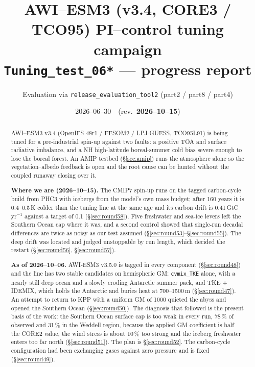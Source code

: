 \documentclass[10pt]{article}
\title{\vspace{-1.5cm}\textbf{AWI--ESM3 (v3.4, CORE3 / TCO95) PI--control tuning campaign}\\[2pt]
\large \texttt{Tuning\_test\_06*} --- progress report}
\author{Evaluation via \texttt{release\_evaluation\_tool2} (part2 / part8 / part4)}
\date{2026--06--30\ \ (rev.\ \textbf{2026--10--15})}
\begin{document}
\maketitle
\vspace{-0.6cm}

\begin{abstract}\noindent
AWI--ESM3 v3.4 (OpenIFS 48r1 / FESOM2 / LPJ-GUESS, TCO95L91) is being tuned for a
pre-industrial spin-up against two faults: a positive TOA and surface radiative imbalance,
and a NH high-latitude boreal-summer cold bias severe enough to lose the boreal forest. An
AMIP testbed (\S\ref{sec:amip}) runs the atmosphere alone so the vegetation--albedo feedback
is open and the root cause can be hunted without the coupled runaway closing over it.

\medskip\noindent\textbf{Where we are (2026--10--15).} The CMIP7 spin-up runs on the tagged carbon-cycle
build from PHC3 with icebergs from the model's own mass budget; after 160 years it is 0.4--0.5\,K colder
than the tuning line at the same age and its carbon drift is 0.41\,GtC\,yr$^{-1}$ against a target of 0.1
(\S\ref{sec:round58}). Five freshwater and sea-ice levers left the Southern Ocean cap where it was, and a
second control showed that single-run decadal differences are twice as noisy as our test assumed
(\S\ref{sec:round53}--\S\ref{sec:round55}). The deep drift was located and judged unstoppable by run
length, which decided the restart (\S\ref{sec:round56}, \S\ref{sec:round57}).

\medskip\noindent\textbf{As of 2026--10--06.} AWI-ESM3 v3.5.0 is tagged in every
component (\S\ref{sec:round48}) and the line has two stable candidates on hemispheric GM:
\texttt{cvmix\_TKE} alone, with a nearly still deep ocean and a slowly eroding Antarctic summer pack,
and TKE + IDEMIX, which holds the Antarctic and buries heat at 700--1500\,m (\S\ref{sec:round47}). An
attempt to return to KPP with a uniform GM of 1000 quieted the abyss and opened the Southern Ocean
(\S\ref{sec:round50}). The diagnosis that followed is the present basis of the work: the Southern
Ocean surface cap is too weak in every run, 78\,\% of observed and 31\,\% in the Weddell region,
because the applied GM coefficient is half the CORE2 value, the wind stress is about 10\,\% too strong
and the iceberg freshwater enters too far north (\S\ref{sec:round51}). The plan is \S\ref{sec:round52}.
The carbon-cycle configuration had been exchanging gases against zero pressure and is fixed
(\S\ref{sec:round49}).


\end{abstract}
\end{document}
